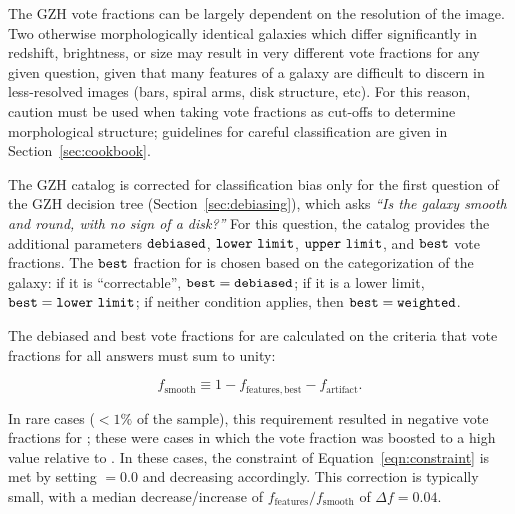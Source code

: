 \documentclass[twocolumn]{aastex6}
\begin{document}
The GZH vote fractions can be largely dependent on the resolution of the image. Two otherwise morphologically identical galaxies which differ significantly in redshift, brightness, or size may result in very different vote fractions for any given question, given that many features of a galaxy are difficult to discern in less-resolved images (bars, spiral arms, disk structure, etc). For this reason, caution must be used when taking vote fractions as cut-offs to determine morphological structure; guidelines for careful classification are given in Section~\ref{sec:cookbook}. 

The GZH catalog is corrected for classification bias only for the first question of the GZH decision tree (Section~\ref{sec:debiasing}), which asks {\it ``Is the galaxy smooth and round, with no sign of a disk?''} For this question, the catalog provides the additional parameters $\tt debiased$, $\tt lower~limit$, $\tt upper~limit$, and $\tt best$ vote fractions. The $\tt best$ fraction for \ffeatures{} is chosen based on the categorization of the galaxy: if it is ``correctable'', $\tt best = debiased$; if it is a lower limit, $\tt best = lower~limit$; if neither condition applies, then $\tt best = weighted$. 

The debiased and best vote fractions for \fsmooth{} are calculated on the criteria that vote fractions for all answers must sum to unity:

\begin{equation}
f_\mathrm{smooth} \equiv 1 - f_\mathrm{features,best} - f_\mathrm{artifact}.
\label{eqn:constraint}
\end{equation}

\noindent In rare cases ($<1\%$ of the sample), this requirement resulted in negative vote fractions for \fsmooth; these were cases in which the \ffeatures{} vote fraction was boosted to a high value relative to \fartifact. In these cases, the constraint of Equation~\ref{eqn:constraint} is met by setting \fsmooth$=0.0$ and decreasing \fbest{} accordingly. This correction is typically small, with a median decrease/increase of $f_\mathrm{features}/f_\mathrm{smooth}$ of $\Delta f = 0.04$.
\end{document}
